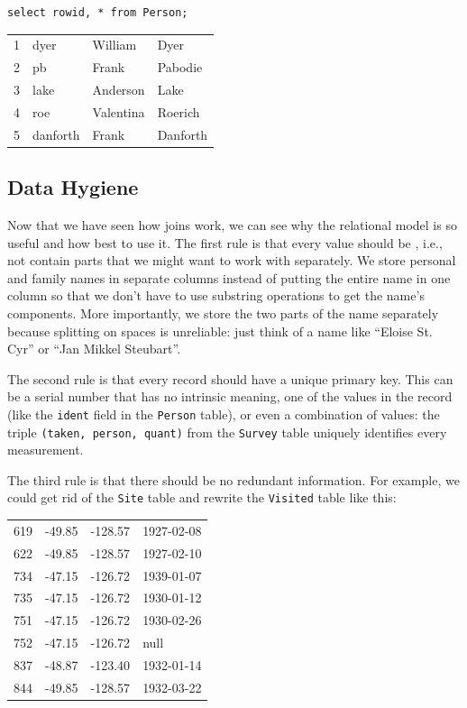 \documentclass{book}
\begin{document}
\begin{verbatim}
select rowid, * from Person;
\end{verbatim}

\begin{tabular}{llll}
1 & dyer & William & Dyer \\
2 & pb & Frank & Pabodie \\
3 & lake & Anderson & Lake \\
4 & roe & Valentina & Roerich \\
5 & danforth & Frank & Danforth \\
\end{tabular}

\subsection{Data Hygiene}

Now that we have seen how joins work, we can see why the relational
model is so useful and how best to use it. The first rule is that every
value should be , i.e., not contain
parts that we might want to work with separately. We store personal and
family names in separate columns instead of putting the entire name in
one column so that we don't have to use substring operations to get the
name's components. More importantly, we store the two parts of the name
separately because splitting on spaces is unreliable: just think of a
name like ``Eloise St. Cyr'' or ``Jan Mikkel Steubart''.

The second rule is that every record should have a unique primary key.
This can be a serial number that has no intrinsic meaning, one of the
values in the record (like the \texttt{ident} field in the
\texttt{Person} table), or even a combination of values: the triple
\texttt{(taken, person, quant)} from the \texttt{Survey} table uniquely
identifies every measurement.

The third rule is that there should be no redundant information. For
example, we could get rid of the \texttt{Site} table and rewrite the
\texttt{Visited} table like this:

\begin{tabular}{llll}
619 & -49.85 & -128.57 & 1927-02-08 \\
622 & -49.85 & -128.57 & 1927-02-10 \\
734 & -47.15 & -126.72 & 1939-01-07 \\
735 & -47.15 & -126.72 & 1930-01-12 \\
751 & -47.15 & -126.72 & 1930-02-26 \\
752 & -47.15 & -126.72 & null \\
837 & -48.87 & -123.40 & 1932-01-14 \\
844 & -49.85 & -128.57 & 1932-03-22 \\
\end{tabular}
\end{document}
